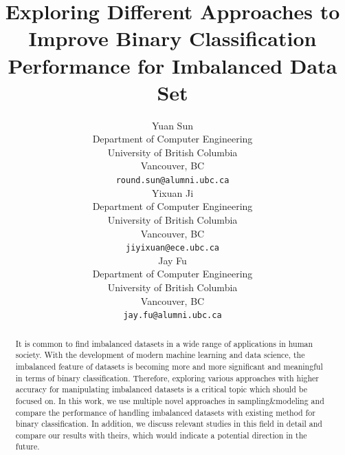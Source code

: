 \documentclass{article}
\title{Exploring Different Approaches to Improve Binary Classification Performance for Imbalanced Data Set}
\author{%
  Yuan Sun\\
  Department of Computer Engineering\\
  University of British Columbia\\
  Vancouver, BC\\
  \texttt{round.sun@alumni.ubc.ca}\\
  \And
  Yixuan Ji\\
  Department of Computer Engineering\\
  University of British Columbia\\
  Vancouver, BC\\
  \texttt{jiyixuan@ece.ubc.ca}\\
  \AND
  Jay Fu\\
  Department of Computer Engineering\\
  University of British Columbia\\
  Vancouver, BC\\
  \texttt{jay.fu@alumni.ubc.ca}\\
}
\begin{document}

\maketitle

\begin{abstract}
It is common to find imbalanced datasets in a wide range of applications in human society. With the development of modern machine learning and data science, the imbalanced feature of datasets is becoming more and more significant and meaningful in terms of binary classification. Therefore, exploring various approaches with higher accuracy for manipulating imbalanced datasets is a critical topic which should be focused on. In this work, we use multiple novel approaches in sampling\&modeling and compare the performance of handling imbalanced datasets with existing method for binary classification. In addition, we discuss relevant studies in this field in detail and compare our results with theirs, which would indicate a potential direction in the future.
\end{abstract}
\end{document}
